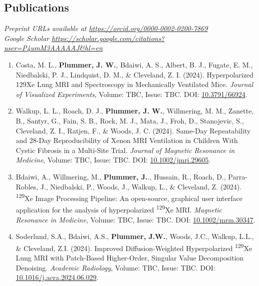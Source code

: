 \documentclass[12pt,]{scrartcl}
\begin{document}
\subsection{Publications}\label{publications}

\emph{Preprint URLs available at
\url{https://orcid.org/0000-0002-0200-7869}}\\
\emph{Google Scholar \url{https://scholar.google.com/citations?user=P4umM3AAAAAJ&hl=en}}

\begin{enumerate}
  \leftskip-0.13in %


    \item Costa, M. L., \textbf{Plummer, J. W.}, Bdaiwi, A. S., Albert, B. J., Fugate, E. M., Niedbalski, P. J., Lindquist, D. M., \& Cleveland, Z. I. (2024). Hyperpolarized 129Xe Lung MRI and Spectroscopy in Mechanically Ventilated Mice. \textit{Journal of Visualized Experiments}, Volume: TBC, Issue: TBC. DOI: \href{https://app.jove.com/t/66924/hyperpolarized-129xe-lung-mri-spectroscopy-mechanically-ventilated}{10.3791/66924}.

    \item Walkup, L. L., Roach, D. J., \textbf{Plummer, J. W.}, Willmering, M. M., Zanette, B., Santyr, G., Fain, S. B., Rock, M. J., Mata, J., Froh, D., Stanojevic, S., Cleveland, Z. I., Ratjen, F., \& Woods, J. C. (2024). Same-Day Repeatability and 28-Day Reproducibility of Xenon MRI Ventilation in Children With Cystic Fibrosis in a Multi-Site Trial. \textit{Journal of Magnetic Resonance in Medicine}, Volume: TBC, Issue: TBC. DOI: \href{https://doi.org/10.1002/jmri.29605}{10.1002/jmri.29605}.

    \item Bdaiwi, A., Willmering, M., \textbf{Plummer, J.}., Hussain, R., Roach, D., Parra-Robles, J., Niedbalski, P., Woods, J., Walkup, L., \& Cleveland, Z. (2024). \textsuperscript{129}Xe Image Processing Pipeline: An open-source, graphical user interface application for the analysis of hyperpolarized \textsuperscript{129}Xe MRI. \textit{Magnetic Resonance in Medicine}, Volume: TBC, Issue: TBC. DOI: \href{https://doi.org/10.1002/mrm.30347}{10.1002/mrm.30347}.
  
    \item Soderlund, S.A., Bdaiwi, A.S., \textbf{Plummer, J.W.}, Woods, J.C., Walkup, L.L., \& Cleveland, Z.I. (2024). Improved Diffusion-Weighted Hyperpolarized \textsuperscript{129}Xe Lung MRI with Patch-Based Higher-Order, Singular Value Decomposition Denoising. \textit{Academic Radiology}, Volume: TBC, Issue: TBC. DOI: \href{https://doi.org/10.1016/j.acra.2024.06.029}{10.1016/j.acra.2024.06.029}.
  

\end{enumerate}
\end{document}
